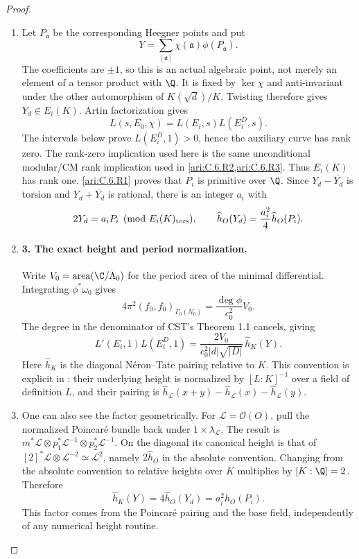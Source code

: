 \begin{proof}
\begin{enumerate}[label=\arabic*.,leftmargin=*]
\item Let $P_{\mathfrak a}$ be the corresponding Heegner points and put
\[
 Y=\sum_{[\mathfrak a]}\chi(\mathfrak a)\phi(P_{\mathfrak a}).
\]
The coefficients are $\pm1$, so this is an actual algebraic point,
not merely an element of a tensor product with $\Q$. It is fixed
by $\ker\chi$ and anti-invariant under the other automorphism of
$K(\sqrt d)/K$. Twisting therefore gives $Y_d\in E_i(K)$.
Artin factorization gives
\[
 L(s,E_0,\chi)=L(E_i,s)L(E_i^D,s).
\]
The intervals below prove $L(E_i^D,1)>0$, hence the auxiliary
curve has rank zero. The rank-zero implication used here is the
same unconditional modular/CM rank implication used in \cref{ari:C.6.R2,ari:C.6.R3}.
Thus $E_i(K)$ has rank one. \ref{ari:C.6.R1} proves that $P_i$ is primitive
over $\Q$. Since $Y_d-\overline{Y_d}$ is torsion and
$Y_d+\overline{Y_d}$ is rational, there is an integer $a_i$ with
\[
 2Y_d=a_iP_i\pmod{E_i(K)_{\rm tors}},\qquad
 \widehat h_O(Y_d)=\frac{a_i^2}{4}\widehat h_O(P_i).
\]

\item \paragraph{3. The exact height and period normalization.}
Write $V_0=\operatorname{area}(\C/\Lambda_0)$ for the period area
of the minimal differential. Integrating $\phi^*\omega_0$ gives
\[
 4\pi^2(f_0,f_0)_{\Gamma_0(N_0)}
   =\frac{\deg\phi}{c_0^2}V_0.
\]
The degree in the denominator of CST's Theorem 1.1 cancels, giving
\begin{equation}\label{ari:eq:Cgz-product}
 L'(E_i,1)L(E_i^D,1)
  =\frac{2V_0}{c_0^2|d|\sqrt{|D|}}\,\widehat h_K(Y).
\end{equation}
Here $\widehat h_K$ is the diagonal N\'eron--Tate pairing relative
to $K$. This convention is explicit in
\citet[\S7.1.1, pp.~218--219, Theorem 7.1.2]{CgzYZZ2011}:
their underlying height is normalized by $[L:K]^{-1}$ over a
field of definition $L$, and their pairing is
$\widehat h_{\mathcal L}(x+y)-\widehat h_{\mathcal L}(x)
-\widehat h_{\mathcal L}(y)$.

\item One can also see the factor geometrically. For
$\mathcal L=\mathcal O(O)$, pull the normalized Poincar\'e bundle
back under $1\times\lambda_{\mathcal L}$. The result is
$m^*\mathcal L\otimes p_1^*\mathcal L^{-1}\otimes
p_2^*\mathcal L^{-1}$. On the diagonal its canonical height is
that of $[2]^*\mathcal L\otimes\mathcal L^{-2}\simeq
\mathcal L^2$, namely $2\widehat h_O$ in the absolute convention.
Changing from the absolute convention to relative heights over
$K$ multiplies by $[K:\Q]=2$. Therefore
\[
 \widehat h_K(Y)=4\widehat h_O(Y_d)
                =a_i^2\widehat h_O(P_i).
\]
This factor comes from the Poincar\'e pairing and the base field,
independently of any numerical height routine.


\end{enumerate}
\end{proof}
